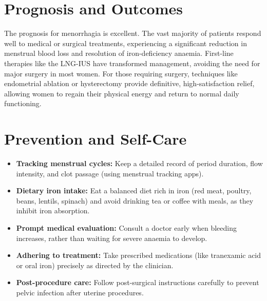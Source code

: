 \section*{Prognosis and Outcomes}
The prognosis for menorrhagia is excellent. The vast majority of patients respond well to medical or surgical treatments, experiencing a significant reduction in menstrual blood loss and resolution of iron-deficiency anaemia. First-line therapies like the LNG-IUS have transformed management, avoiding the need for major surgery in most women. For those requiring surgery, techniques like endometrial ablation or hysterectomy provide definitive, high-satisfaction relief, allowing women to regain their physical energy and return to normal daily functioning.

\section*{Prevention and Self-Care}
\begin{itemize}
    \item \textbf{Tracking menstrual cycles:} Keep a detailed record of period duration, flow intensity, and clot passage (using menstrual tracking apps).
    \item \textbf{Dietary iron intake:} Eat a balanced diet rich in iron (red meat, poultry, beans, lentils, spinach) and avoid drinking tea or coffee with meals, as they inhibit iron absorption.
    \item \textbf{Prompt medical evaluation:} Consult a doctor early when bleeding increases, rather than waiting for severe anaemia to develop.
    \item \textbf{Adhering to treatment:} Take prescribed medications (like tranexamic acid or oral iron) precisely as directed by the clinician.
    \item \textbf{Post-procedure care:} Follow post-surgical instructions carefully to prevent pelvic infection after uterine procedures.
\end{itemize}

